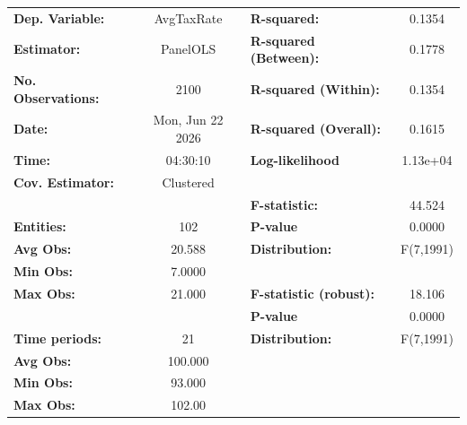 \begin{center}
\begin{tabular}{lclc}
\toprule
\textbf{Dep. Variable:}                       &     AvgTaxRate     & \textbf{  R-squared:         }   &      0.1354      \\
\textbf{Estimator:}                           &      PanelOLS      & \textbf{  R-squared (Between):}  &      0.1778      \\
\textbf{No. Observations:}                    &        2100        & \textbf{  R-squared (Within):}   &      0.1354      \\
\textbf{Date:}                                &  Mon, Jun 22 2026  & \textbf{  R-squared (Overall):}  &      0.1615      \\
\textbf{Time:}                                &      04:30:10      & \textbf{  Log-likelihood     }   &     1.13e+04     \\
\textbf{Cov. Estimator:}                      &     Clustered      & \textbf{                     }   &                  \\
\textbf{}                                     &                    & \textbf{  F-statistic:       }   &      44.524      \\
\textbf{Entities:}                            &        102         & \textbf{  P-value            }   &      0.0000      \\
\textbf{Avg Obs:}                             &       20.588       & \textbf{  Distribution:      }   &    F(7,1991)     \\
\textbf{Min Obs:}                             &       7.0000       & \textbf{                     }   &                  \\
\textbf{Max Obs:}                             &       21.000       & \textbf{  F-statistic (robust):} &      18.106      \\
\textbf{}                                     &                    & \textbf{  P-value            }   &      0.0000      \\
\textbf{Time periods:}                        &         21         & \textbf{  Distribution:      }   &    F(7,1991)     \\
\textbf{Avg Obs:}                             &      100.000       & \textbf{                     }   &                  \\
\textbf{Min Obs:}                             &       93.000       & \textbf{                     }   &                  \\
\textbf{Max Obs:}                             &       102.00       & \textbf{                     }   &                  \\

\end{tabular}
\end{center}
